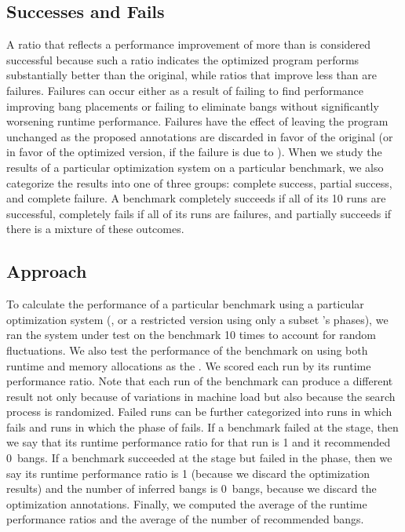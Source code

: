 \subsection{Successes and Fails}
A ratio that reflects a performance improvement of more than \absim{}
is considered successful because such a ratio indicates the
optimized program performs substantially better than the original, 
while ratios that improve less than \absim{} are failures. 
Failures can occur either as a result of \Ao{} failing to find 
performance improving bang placements or \At{} failing to eliminate 
bangs without significantly worsening runtime performance. 
Failures have the effect of leaving the program
unchanged as the proposed annotations are discarded in favor of the
original (or in favor of the \Ao{} optimized version, if the failure is due to \At{}).
When we study the results of a particular optimization system on a
particular benchmark, we also categorize the results into one of three
groups: complete success, partial success, and complete failure.  A
benchmark completely succeeds if all of its 10 runs are successful,
completely fails if all of its runs are failures, and partially
succeeds if there is a mixture of these outcomes.

\subsection{Approach}
To calculate the performance of a particular benchmark using a
particular optimization system (\eg{}, \At{} or a
restricted version using only a subset \At's phases), we ran the system under test on the benchmark 10
times to account for random fluctuations. We also test the performance of the benchmark on \At{} using both runtime and memory allocations as the \profm{}. We scored each run by its runtime performance
ratio. Note that each run of the benchmark can produce a different
result not only because of variations in machine load but also
because the search process is randomized.  Failed runs can be further
categorized into runs in which \Ao{} fails and runs in which
the \postopt{} phase of \At{}
fails. If a benchmark failed at the \Ao{} stage, then we say that its
runtime performance ratio for that run is 1 and it recommended
0~bangs. If a benchmark succeeded at the \Ao{} stage but failed
in the \postopt{} phase, then we say its runtime performance ratio is
1 (because we discard the optimization results) and the
number of inferred bangs is 0~bangs, because we discard the optimization annotations.  
Finally, we computed the average of the runtime
performance ratios and the average of the number of
recommended bangs.

